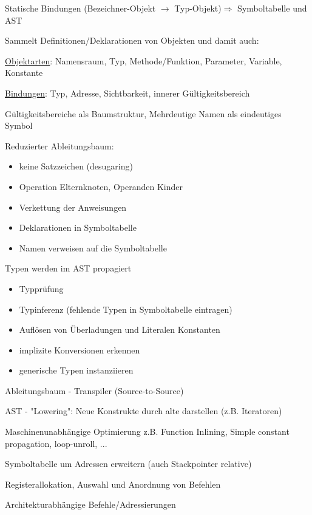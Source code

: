 Statische Bindungen (Bezeichner-Objekt $\rightarrow$ Typ-Objekt)$\Rightarrow$ Symboltabelle und AST

 Sammelt Definitionen/Deklarationen von Objekten und damit auch:

\underline{Objektarten}: Namensraum, Typ, Methode/Funktion, Parameter, Variable, Konstante

\underline{Bindungen}: Typ, Adresse, Sichtbarkeit, innerer Gültigkeitsbereich

Gültigkeitsbereiche als Baumstruktur, Mehrdeutige Namen als eindeutiges Symbol


Reduzierter Ableitungsbaum: 
\begin{itemize}
	\item keine Satzzeichen (desugaring)
	\item Operation Elternknoten, Operanden Kinder
	\item Verkettung der Anweisungen
	\item Deklarationen in Symboltabelle
	\item Namen verweisen auf die Symboltabelle
\end{itemize}

Typen werden im AST propagiert 
\begin{itemize}
\item Typprüfung
\item Typinferenz (fehlende Typen in Symboltabelle eintragen)
\item Auflösen von Überladungen und Literalen Konstanten
\item implizite Konversionen erkennen
\item generische Typen instanziieren
\end{itemize}



Ableitungsbaum - Transpiler (Source-to-Source)

AST - "Lowering": Neue Konstrukte durch alte darstellen (z.B. Iteratoren)

Maschinenunabhängige Optimierung z.B. Function Inlining, Simple constant propagation, loop-unroll, ...



Symboltabelle um Adressen erweitern (auch Stackpointer relative)

Registerallokation, Auswahl und Anordnung von Befehlen

Architekturabhängige Befehle/Adressierungen

